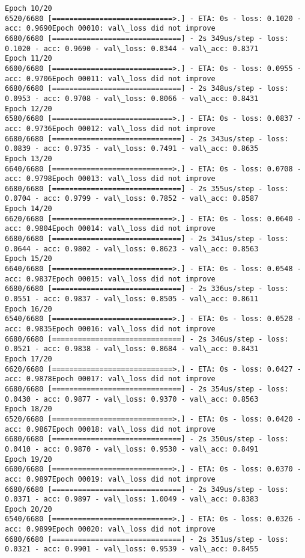 \documentclass[11pt]{article}
\begin{document}
\begin{Verbatim}[commandchars=\\\{\}]
Epoch 10/20
6520/6680 [============================>.] - ETA: 0s - loss: 0.1020 - acc: 0.9690Epoch 00010: val\_loss did not improve
6680/6680 [==============================] - 2s 349us/step - loss: 0.1020 - acc: 0.9690 - val\_loss: 0.8344 - val\_acc: 0.8371
Epoch 11/20
6600/6680 [============================>.] - ETA: 0s - loss: 0.0955 - acc: 0.9706Epoch 00011: val\_loss did not improve
6680/6680 [==============================] - 2s 348us/step - loss: 0.0953 - acc: 0.9708 - val\_loss: 0.8066 - val\_acc: 0.8431
Epoch 12/20
6580/6680 [============================>.] - ETA: 0s - loss: 0.0837 - acc: 0.9736Epoch 00012: val\_loss did not improve
6680/6680 [==============================] - 2s 343us/step - loss: 0.0839 - acc: 0.9735 - val\_loss: 0.7491 - val\_acc: 0.8635
Epoch 13/20
6640/6680 [============================>.] - ETA: 0s - loss: 0.0708 - acc: 0.9798Epoch 00013: val\_loss did not improve
6680/6680 [==============================] - 2s 355us/step - loss: 0.0704 - acc: 0.9799 - val\_loss: 0.7852 - val\_acc: 0.8587
Epoch 14/20
6620/6680 [============================>.] - ETA: 0s - loss: 0.0640 - acc: 0.9804Epoch 00014: val\_loss did not improve
6680/6680 [==============================] - 2s 341us/step - loss: 0.0644 - acc: 0.9802 - val\_loss: 0.8623 - val\_acc: 0.8563
Epoch 15/20
6640/6680 [============================>.] - ETA: 0s - loss: 0.0548 - acc: 0.9837Epoch 00015: val\_loss did not improve
6680/6680 [==============================] - 2s 336us/step - loss: 0.0551 - acc: 0.9837 - val\_loss: 0.8505 - val\_acc: 0.8611
Epoch 16/20
6540/6680 [============================>.] - ETA: 0s - loss: 0.0528 - acc: 0.9835Epoch 00016: val\_loss did not improve
6680/6680 [==============================] - 2s 346us/step - loss: 0.0521 - acc: 0.9838 - val\_loss: 0.8684 - val\_acc: 0.8431
Epoch 17/20
6620/6680 [============================>.] - ETA: 0s - loss: 0.0427 - acc: 0.9878Epoch 00017: val\_loss did not improve
6680/6680 [==============================] - 2s 354us/step - loss: 0.0430 - acc: 0.9877 - val\_loss: 0.9370 - val\_acc: 0.8563
Epoch 18/20
6520/6680 [============================>.] - ETA: 0s - loss: 0.0420 - acc: 0.9867Epoch 00018: val\_loss did not improve
6680/6680 [==============================] - 2s 350us/step - loss: 0.0410 - acc: 0.9870 - val\_loss: 0.9530 - val\_acc: 0.8491
Epoch 19/20
6600/6680 [============================>.] - ETA: 0s - loss: 0.0370 - acc: 0.9897Epoch 00019: val\_loss did not improve
6680/6680 [==============================] - 2s 349us/step - loss: 0.0371 - acc: 0.9897 - val\_loss: 1.0049 - val\_acc: 0.8383
Epoch 20/20
6540/6680 [============================>.] - ETA: 0s - loss: 0.0326 - acc: 0.9899Epoch 00020: val\_loss did not improve
6680/6680 [==============================] - 2s 351us/step - loss: 0.0321 - acc: 0.9901 - val\_loss: 0.9539 - val\_acc: 0.8455

    \end{Verbatim}
\end{document}
